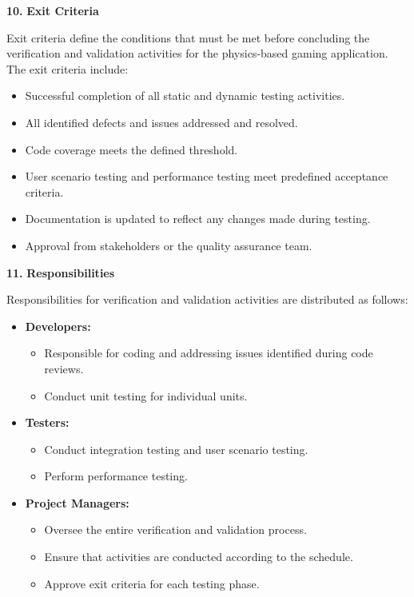 \documentclass[
]{article}
\begin{document}
\protect\hypertarget{Akol}{}{}\textbf{10.} \textbf{Exit Criteria}


Exit criteria define the conditions that must be met before concluding
the verification and validation activities for the physics-based gaming
application. The exit criteria include:

\begin{itemize}
\item
  Successful completion of all static and dynamic testing activities.
\item
  All identified defects and issues addressed and resolved.
\item
  Code coverage meets the defined threshold.
\item
  User scenario testing and performance testing meet predefined
  acceptance criteria.
\item
  Documentation is updated to reflect any changes made during testing.
\item
  Approval from stakeholders or the quality assurance team.
\end{itemize}


\protect\hypertarget{Ahhhh}{}{}\textbf{11.} \textbf{Responsibilities}


Responsibilities for verification and validation activities are
distributed as follows:

\begin{itemize}
\item
  \textbf{Developers:}

  \begin{itemize}
  \item
    Responsible for coding and addressing issues identified during code
    reviews.
  \item
    Conduct unit testing for individual units.
  \end{itemize}
\item
  \textbf{Testers:}

  \begin{itemize}
  \item
    Conduct integration testing and user scenario testing.
  \item
    Perform performance testing.
  \end{itemize}
\item
  \textbf{Project Managers:}

  \begin{itemize}
  \item
    Oversee the entire verification and validation process.
  \item
    Ensure that activities are conducted according to the schedule.
  \item
    Approve exit criteria for each testing phase.
  \end{itemize}
\end{itemize}
\end{document}
